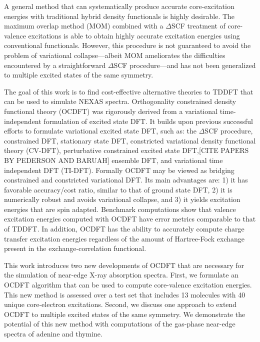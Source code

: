 \documentclass[12pt]{article}
\begin{document}
A general method that can systematically produce accurate core-excitation energies with traditional hybrid density functionals is highly desirable. The maximum overlap method (MOM) \cite{besley_self-consistent-field_2009} combined with a $\Delta$SCF treatment of core-valence excitations is able to obtain highly accurate excitation energies using conventional functionals. However, this procedure is not guaranteed to avoid the problem of variational collapse---albeit MOM ameliorates the difficulties encountered by a straightforward $\Delta$SCF procedure---and has not been generalized to multiple excited states of the same symmetry.

The goal of this work is to find cost-effective alternative theories to TDDFT that can be used to simulate NEXAS spectra.
Orthogonality constrained density functional theory (OCDFT)\cite{evangelista_orthogonality_2013}  was rigorously derived from a variational time-independent formulation of excited state DFT.
It builds upon previous successful efforts to formulate variational excited state DFT, such as: the $\Delta$SCF procedure, \cite{kowalczyk_assessment_2011,ziegler_calculation_1977} constrained DFT,\cite{wu_constrained_2006} stationary state DFT, \cite{gorling_density-functional_1999}  constricted variational density functional theory (CV-DFT), \cite{ziegler_relation_2009,ziegler_application_2011,krykunov_self-consistent_2013,ziegler_implementation_2012}
perturbative constrained excited state DFT,\cite{}[CITE PAPERS BY PEDERSON AND BARUAH] ensemble DFT,\cite{theophilou_energy_1979,fritsche_generalized_1986,gross_rayleigh-ritz_1988,gross_density-functional_1988} and variational time independent DFT (TI-DFT). \cite{levy_variational_1999,nagy_variational_2001}
Formally OCDFT may be viewed as bridging constrained and constricted variational DFT.  Its main advantages are: 1) it has favorable accuracy/cost ratio, similar to that of ground state DFT, 2) it is numerically robust and avoids variational collapse, and 3) it yields excitation energies that are spin adapted.
Benchmark computations\cite{evangelista_orthogonality_2013} show that valence excitation energies computed with OCDFT have error metrics comparable to that of TDDFT.  In addition, OCDFT has the ability to accurately compute charge transfer excitation energies regardless of the amount of Hartree-Fock exchange present in the exchange-correlation functional.

This work introduces two new developments of OCDFT that are necessary for the simulation of near-edge X-ray  absorption spectra.
First, we formulate an OCDFT algorithm that can be used to compute core-valence excitation energies.  This new method is assessed over a test set that includes 13 molecules with 40 unique core-electron excitations.
Second, we discuss one approach to extend OCDFT to multiple excited states of the same symmetry.
We demonstrate the potential of this new method with computations of the gas-phase near-edge spectra of adenine and thymine.
\end{document}
